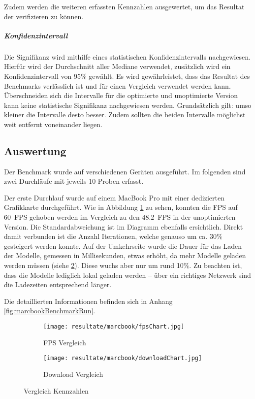Zudem werden die weiteren erfassten Kennzahlen ausgewertet, um das Resultat der  verifizieren zu können.

\subparagraph{Konfidenzintervall}
Die Signifikanz wird mithilfe eines statistischen Konfidenzintervalls nachgewiesen. Hierfür wird der Durchschnitt aller Mediane verwendet, zusätzlich wird ein Konfidenzintervall von 95\% gewählt. Es wird gewährleistet, dass das Resultat des Benchmarks verlässlich ist und für einen Vergleich verwendet werden kann. Überschneiden sich die Intervalle für die optimierte und unoptimierte Version kann keine statistische Signifikanz nachgewiesen werden. Grundsätzlich gilt: umso kleiner die Intervalle desto besser. Zudem sollten die beiden Intervalle möglichst weit entfernt voneinander liegen.

\subsection{Auswertung}
\label{chap:benchmarkResults}

Der Benchmark wurde auf verschiedenen Geräten ausgeführt. Im folgenden sind zwei Durchläufe mit jeweils 10 Proben erfasst.

Der erste Durchlauf wurde auf einem MacBook Pro mit einer dedizierten Grafikkarte durchgeführt. Wie in Abbildung \ref{fig:benchmarkFpsChartMarcbook} zu sehen, konnten die FPS auf 60 FPS gehoben werden im Vergleich zu den 48.2 FPS in der unoptimierten Version. Die Standardabweichung ist im Diagramm ebenfalls ersichtlich.
Direkt damit verbunden ist die Anzahl  Iterationen, welche genauso um ca. 30\% gesteigert werden konnte. Auf der Umkehrseite wurde die Dauer für das Laden der Modelle, gemessen in Millisekunden, etwas erhöht, da mehr Modelle geladen werden müssen (siehe \ref{fig:benchmarkDownloadChartMarcbook}). Diese wuchs aber nur um rund 10\%. Zu beachten ist, dass die Modelle lediglich lokal geladen werden – über ein richtiges Netzwerk sind die Ladezeiten entsprechend länger.

Die detaillierten Informationen befinden sich in Anhang \ref{fig:marcbookBenchmarkRun}.

\begin{figure}[H]
  \centering
  \begin{subfigure}{.49\textwidth}
    \centering
    \texttt{[image: resultate/marcbook/fpsChart.jpg]}
    \caption{FPS Vergleich}
    \label{fig:benchmarkFpsChartMarcbook}
  \end{subfigure}
  \begin{subfigure}{.49\textwidth}
    \centering
    \texttt{[image: resultate/marcbook/downloadChart.jpg]}
    \caption{Download Vergleich}
    \label{fig:benchmarkDownloadChartMarcbook}
  \end{subfigure}
  \caption{Vergleich Kennzahlen}
  \label{fig:benchmarkChartMarcbook}
\end{figure}


